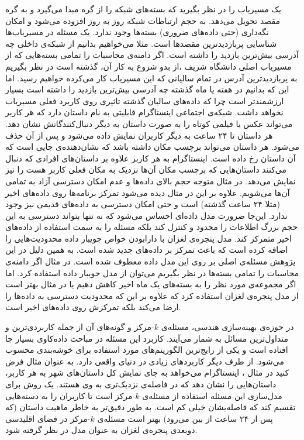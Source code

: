 یک مسیریاب  را در نظر بگیرید که بسته‌های  شبکه را از گره  مبدا می‌گیرد و به گره مقصد تحویل می‌دهد. به حجم ارتباطات شبکه روز به روز افزوده می‌شود و امکان نگه‌داری (حتی داده‌های ضروری) بسته‌ها وجود ندارد. یک مسئله در مسیریاب‌ها شناسایی پربازدیدترین مقصدها است. مثلا می‌خواهیم بدانیم از شبکه‌ی داخلی  چه آدرسی بیش‌ترین بازدید را داشته است. اگر دامنه‌ی محاسبات را تمامی بسته‌هایی که از مسیریاب اصلی دانشگاه شریف ،از بدو شروع به کار آن، گذشته است در نظر بگیریم به پربازدیدترین آدرس در تمام سالیانی که این مسیریاب کار می‌کرده خواهیم رسید. اما این که بدانیم در هفته یا ماه گذشته چه آدرسی بیش‌ترین بازدید را داشته است بسیار ارزشمندتر است چرا که داده‌های سالیان گذشته تاثیری روی کاربرد فعلی مسیریاب نخواهد داشت.
شبکه‌ی اجتماعی اینستاگرام  قابلیتی به نام داستان  دارد که هر کاربر می‌تواند عکس یا فیلمی کوتاه را به صورت داستان به دیگر دنبال‌کنندگانش نشان دهد. هر داستان تا ۲۴ ساعت به دیگر کاربران نمایش داده می‌شود و پس از آن حذف می‌شود. هر داستان می‌تواند برچسب مکان داشته باشد که نشان‌دهنده‌ی جایی است که آن داستان رخ داده است. اینستاگرام به هر کاربر علاوه بر داستان‌های افرادی که دنبال می‌کنند داستان‌هایی که برچسب مکان آن‌ها نزدیک به مکان فعلی کاربر هست را نیز نمایش می‌دهد.
در مثال  متوجه حجم بالای داده‌ها و عدم امکان دسترسی آزاد به تمامی آن‌ها می‌شویم. علاوه بر این در مثال  دیده می‌شود تمرکز برنامه‌ها روی داده‌های اخیر (مثلا ۲۴ ساعت گذشته) است و حتی امکان دسترسی به داده‌های قدیمی نیز وجود ندارد.
این‌جا ضرورت مدل‌ داده‌ای احساس می‌شود که نه تنها بتواند دسترسی به این حجم بزرگ اطلاعات را محدود و کنترل کند بلکه مسئله را به سمت استفاده از داده‌های اخیر متمرکز کند. مدل پنجره‌ی لغزان با دارابودن خواص جویبار داده محدودیت‌هایی را اضافه کرده است که باعث تمرکز بر داده‌های جدید شده است. به همین دلیل در این پژوهش مسئله‌ی اصلی بر روی این مدل داده معطوف شده است.
در مثال  اگر دامنه‌ی محاسبات را تمامی بسته‌ها در نظر بگیریم می‌توان از مدل جویبار داده استفاده کرد. اما اگر مجموعه‌ی مورد نظر را به بسته‌های یک ماه اخیر کاهش دهیم یا در مثال  بهتر است از مدل پنجره‌ی لغزان استفاده کرد که علاوه بر این که محدودیت دسترسی به داده‌ها را ارضا می‌کند بلکه تمرکزش روی داده‌های اخیر است.

در حوزه‌ی بهینه‌سازی هندسی، مسئله‌ی $k$-مرکز و گونه‌های آن از جمله کاربردی‌ترین و متداول‌ترین مسائل به شمار می‌آیند. کاربرد این مسئله در مباحث داده‌کاوی بسیار جا افتاده است و یکی از رایج‌ترین الگوریتم‌های مورد استفاده برای خوشه‌بندی محسوب می‌شود. از طرف دیگر کاربردهای زیادی در دنیای واقعی دارد.
 به عنوان مثال فرض کنید در مثال ، اینستاگرام می‌خواهد به جای نمایش کل داستان‌های شهر به هر کاربر، داستان‌هایی را نشان دهد که در فاصله‌ی نزدیک‌تری به وی هستند. یک روش برای مدل‌سازی این مسئله استفاده از مسئله‌ی $k$-مرکز است تا کاربران را به دسته‌هایی تقسیم کند که فاصله‌‌یشان خیلی کم است. به طور دقیق‌تر به خاطر ماهیت داستان (که پس از ۲۴ ساعت از بین می‌رود) بهتر است مسئله‌ی $k$-مرکز در فضای اقلیدسی دوبعدی پنجره‌ی لغزان به عنوان مدل در نظر گرفته شود.

